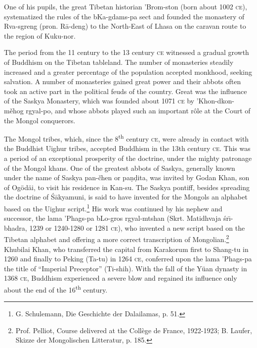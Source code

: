 \documentclass[a4paper, 12pt, oneside]{article}
\begin{document}
One of his pupils, the great Tibetan historian 'Brom-ston (born about 1002 \textsc{ce}), systematized the rules of the bKa-gdams-pa sect and founded the monastery of Rva-sgreng (pron. R\={a}-deng) to the North-East of Lhasa on the caravan route to the region of Kuku-nor.

The period from the 11 century to the 13 century \textsc{ce} witnessed a gradual growth of Buddhism on the Tibetan tableland. The number of monasteries steadily increased and a greater percentage of the population accepted monkhood, seeking salvation. A number of monasteries gained great power and their abbots often took an active part in the political feuds of the country. Great was the influence of the Saskya Monastery, which was founded about 1071 \textsc{ce} by 'Khon-dkon-měhog rgyal-po, and whose abbots played such an important rôle at the Court of the Mongol conquerors.

The Mongol tribes, which, since the 8\textsuperscript{th} century \textsc{ce}, were already in contact with the Buddhist Uighur tribes, accepted Buddhism in the 13th century \textsc{ce}. This was a period of an exceptional prosperity of the doctrine, under the mighty patronage of the Mongol khans. One of the greatest abbots of Saskya, generally known under the name of Saskya pan-čhen or pa\d{n}\d{d}ita, was invited by Godan Khan, son of Ogödäi, to visit his residence in Kan-su. The Saskya pontiff, besides spreading the doctrine of \'{S}\={a}kyamuni, is said to have invented for the Mongols an alphabet based on the Uighur script.\footnote{G. Schulemann, Die Geschichte der Dalailamas, p. 51.} His work was continued by his nephew and successor, the lama 'Phags-pa  bLo-gros rgyal-mtshan (Skrt. Matidhvaja \'{s}r\={\i}-bhadra, 1239 or 1240-1280 or 1281 \textsc{ce}), who invented a new script based on the Tibetan alphabet and offering a more correct transcription of Mongolian.\footnote{Prof. Pelliot, Course delivered at the Collège de France, 1922-1923; B. Laufer, Skizze der Mongolischen Litteratur, p. 185.} Khubilai Khan, who transferred the capital from Karakorum first to Shang-tu in 1260 and finally to Peking (Ta-tu) in 1264 \textsc{ce}, conferred upon the lama 'Phags-pa the title of ``Imperial Preceptor'' (Ti-shih). With the fall of the Yüan dynasty in 1368 \textsc{ce}, Buddhism experienced a severe blow and regained its influence only about the end of the 16\textsuperscript{th} century.
\end{document}
